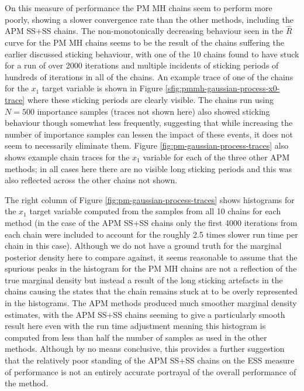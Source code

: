 On this measure of performance the \ac{PM} \ac{MH} chains seem to perform more poorly, showing a slower convergence rate than the other methods, including the \ac{APM} \ac{SS}+\ac{SS} chains. The non-monotonically decreasing behaviour seen in the $\hat{R}$ curve for the \ac{PM} \ac{MH} chains seems to be the result of the chains suffering the earlier discussed sticking behaviour, with one of the 10 chains found to have stuck for a run of over 2000 iterations and multiple incidents of sticking periods of hundreds of iterations in all of the chains. An example trace of one of the chains for the $x_1$ target variable is shown in Figure \ref{sfig:pmmh-gaussian-process-x0-trace} where these sticking periods are clearly visible. The chains run using $N=500$ importance samples (traces not shown here) also showed sticking behaviour though somewhat less frequently, suggesting that while increasing the number of importance samples can lessen the impact of these events, it does not seem to necessarily eliminate them. Figure \ref{fig:pm-gaussian-process-traces} also shows example chain traces for the $x_1$ variable for each of the three other \ac{APM} methods; in all cases here there are no visible long sticking periods and this was also reflected across the other chains not shown. 

The right column of Figure \ref{fig:pm-gaussian-process-traces} shows histograms for the $x_1$ target variable computed from the samples from all 10 chains for each method (in the case of the \ac{APM} \ac{SS}+\ac{SS} chains only the first 4000 iterations from each chain were included to account for the roughly 2.5 times slower run time per chain in this case). Although we do not have a ground truth for the marginal posterior density here to compare against, it seems reasonable to assume that the spurious peaks in the histogram for the \ac{PM} \ac{MH} chains are not a reflection of the true marginal density but instead a result of the long sticking artefacts in the chains causing the states that the chain remains stuck at to be overly represented in the histograms. The \ac{APM} methods produced much smoother marginal density estimates, with the \ac{APM} \ac{SS}+\ac{SS} chains seeming to give a particularly smooth result here even with the run time adjustment meaning this histogram is computed from less than half the number of samples as used in the other methods. Although by no means conclusive, this provides a further suggestion that the relatively poor standing of the \ac{APM} \ac{SS}+\ac{SS} chains on the \ac{ESS} measure of performance is not an entirely accurate portrayal of the overall performance of the method. 

